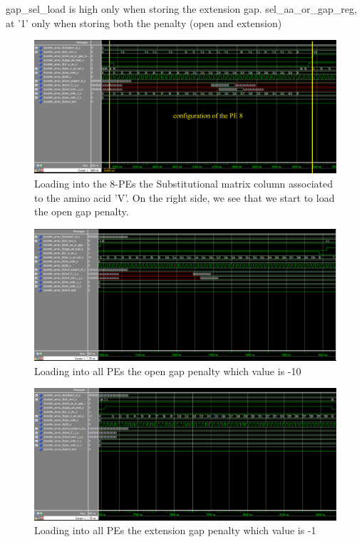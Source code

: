 gap\_sel\_load is high only when storing the extension gap.
sel\_aa\_or\_gap\_reg, at '1' only when storing both the penalty (open and extension)
\begin{figure}[h!]
	\centering
	\includegraphics[width=\textwidth]{imm/sw/load_pe_8.png}
	\caption{Loading into the 8-PEs the Substitutional matrix column associated to the amino acid 'V'. On the right side, we see that we start to load the open gap penalty.} 
	\label{tb_sw_pe8}
\end{figure}
\begin{figure}[h!]
	\centering
	\includegraphics[width=\textwidth]{imm/sw/open_gap_10.png}
	\caption{Loading into all PEs the open gap penalty which value is -10} 
	\label{tb_open_gap_10}
\end{figure}
\begin{figure}[h!]
	\centering
	\includegraphics[width=\textwidth]{imm/sw/ext_gap.png}
	\caption{Loading into all PEs the extension gap penalty which value is -1} 
	\label{tb_ext_gap}
\end{figure}
